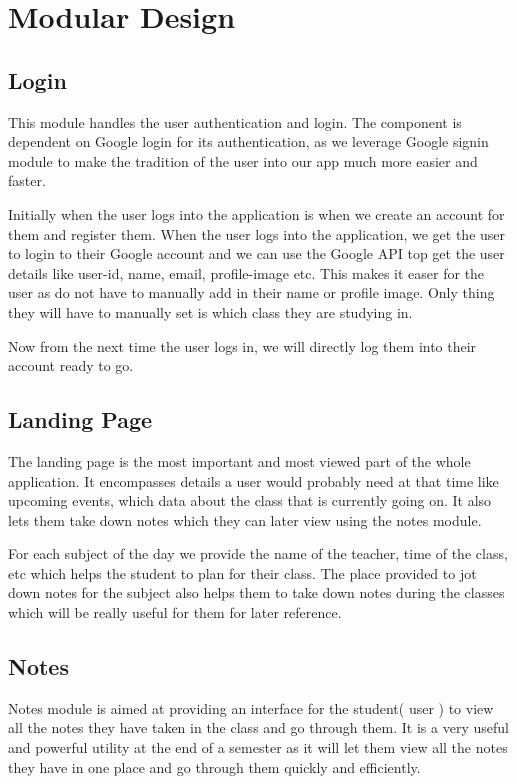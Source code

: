 \section{Modular Design}

\subsection{Login}
This module handles the user authentication and login.
The component is dependent on Google login for its authentication, as we leverage Google signin module to make the tradition of the user into our app much more easier and faster.

Initially when the user logs into the application is when we create an account for them and register them. When the user logs into the application, we get the user to login to their Google account and we can use the Google API top get the user details like user-id, name, email, profile-image etc. This makes it easer for the user as do not have to manually add in their name or profile image. Only thing they will have to manually set is which class they are studying in.

Now from the next time the user logs in, we will directly log them into their account ready to go.

\subsection{Landing Page}
The landing page is the most important and most viewed part of the whole application. It encompasses details a user would probably need at that time like upcoming events, which data about the class that is currently going on. It also lets them take down notes which they can later view using the notes module.

For each subject of the day we provide the name of the teacher, time of the class, etc which helps the student to plan for their class.
The place provided to jot down notes for the subject also helps them to take down notes during the classes which will be really useful for them for later reference.

\subsection{Notes}
Notes module is aimed at providing an interface for the student( user ) to view all the notes they have taken in the class and go through them.
It is a very useful and powerful utility at the end of a semester as it will let them view all the notes they have in one place and go through them quickly and efficiently.

